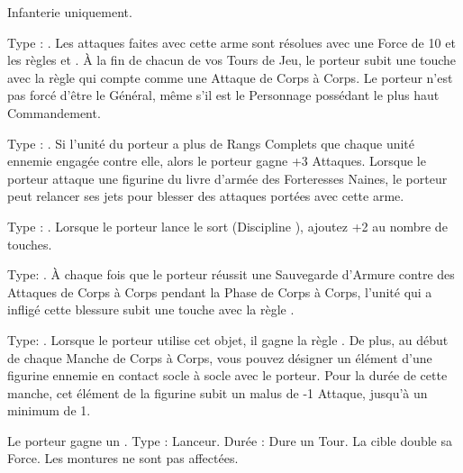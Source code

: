 \closearmyarmoury






\startarmymagicalitems

\armymagicalweapons

\startpricelist

Infanterie uniquement.

Type : \hw{}. Les attaques faites avec cette arme sont résolues avec une Force de 10 et les règles \divineattacks{} et . À la fin de chacun de vos Tours de Jeu, le porteur subit une touche avec la règle \toxicattacks{} qui compte comme une Attaque de Corps à Corps. Le porteur n'est pas forcé d'être le Général, même s'il est le Personnage possédant le plus haut Commandement.

Type : \hw{}. Si l'unité du porteur a plus de Rangs Complets que chaque unité ennemie engagée contre elle, alors le porteur gagne +3 Attaques. Lorsque le porteur attaque une figurine du livre d'armée des Forteresses Naines, le porteur peut relancer ses jets pour blesser des attaques portées avec cette arme.

Type : \halberd{}. Lorsque le porteur lance le sort \ruinsignature{} (Discipline \ruin{}), ajoutez +2 au nombre de touches.

\endpricelist

\armymagicalarmour

\startpricelist

Type: \platearmour{}. À chaque fois que le porteur réussit une Sauvegarde d'Armure contre des Attaques de Corps à Corps pendant la Phase de Corps à Corps, l'unité qui a infligé cette blessure subit une touche avec la règle \toxicattacks{}.

Type: \shield{}. Lorsque le porteur utilise cet objet, il gagne la règle \distracting{}. De plus, au début de chaque Manche de Corps à Corps, vous pouvez désigner un élément d'une figurine ennemie en contact socle à socle avec le porteur. Pour la durée de cette manche, cet élément de la figurine subit un malus de -1 Attaque, jusqu'à un minimum de 1.

\endpricelist

\armytalismans

\startpricelist

 Le porteur gagne un .\newline
Type : Lanceur. Durée : Dure un Tour.\newline
La cible double sa Force. Les montures ne sont pas affectées.

